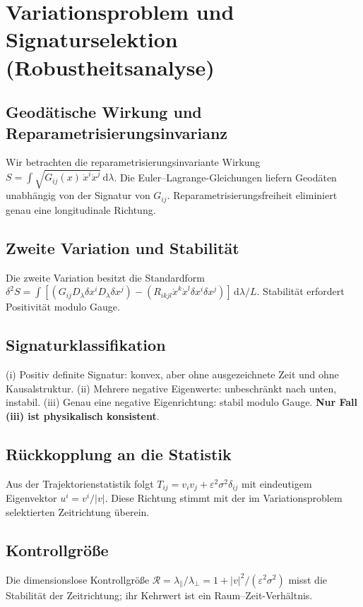 \documentclass[11pt,a4paper]{article}
\begin{document}
\appendix

\section{Variationsproblem und Signaturselektion (Robustheitsanalyse)}
\subsection{Geod\"atische Wirkung und Reparametrisierungsinvarianz}
Wir betrachten die reparametrisierungsinvariante Wirkung $S=\int \sqrt{G_{ij}(x)\,\dot x^i\dot x^j}\,\mathrm d\lambda$. Die Euler--Lagrange-Gleichungen liefern Geod\"aten unabh\"angig von der Signatur von $G_{ij}$. Reparametrisierungsfreiheit eliminiert genau eine longitudinale Richtung.

\subsection{Zweite Variation und Stabilit\"at}
Die zweite Variation besitzt die Standardform $\delta^2 S=\int[(G_{ij}D_\lambda\delta x^i D_\lambda\delta x^j)-(R_{ikjl}\dot x^k\dot x^l\delta x^i\delta x^j)]\,\mathrm d\lambda/L$. Stabilit\"at erfordert Positivit\"at modulo Gauge.

\subsection{Signaturklassifikation}
(i) Positiv definite Signatur: konvex, aber ohne ausgezeichnete Zeit und ohne Kausalstruktur. (ii) Mehrere negative Eigenwerte: unbeschr\"ankt nach unten, instabil. (iii) Genau eine negative Eigenrichtung: stabil modulo Gauge. \textbf{Nur Fall (iii) ist physikalisch konsistent}.

\subsection{R\"uckkopplung an die Statistik}
Aus der Trajektorienstatistik folgt $T_{ij}=v_i v_j+\varepsilon^2\sigma^2\delta_{ij}$ mit eindeutigem Eigenvektor $u^i=v^i/|v|$. Diese Richtung stimmt mit der im Variationsproblem selektierten Zeitrichtung \"uberein.

\subsection{Kontrollgr\"o\ss e}
Die dimensionslose Kontrollgr\"o\ss e $\mathcal R=\lambda_\parallel/\lambda_\perp=1+|v|^2/(\varepsilon^2\sigma^2)$ misst die Stabilit\"at der Zeitrichtung; ihr Kehrwert ist ein Raum--Zeit-Verh\"altnis.
\end{document}

